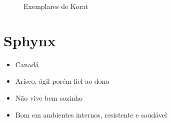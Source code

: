 \documentclass[a4paper]{article}
\begin{document}
  \begin{figure}[ht]
    \centering


    \caption{Exemplares de Korat}
    \label{fig:korat}
  \end{figure}

  \section{Sphynx}

  \begin{itemize}
    \item Canad\'a
    \item Arisco, \'agil por\'em fiel ao dono
    \item N\~ao vive bem sozinho
    \item Bom em ambientes internos, resistente e saud\'avel
  \end{itemize}
\end{document}
